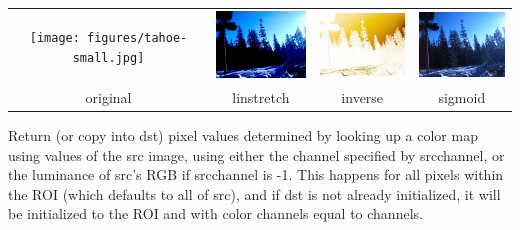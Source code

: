 \noindent \begin{tabular}{cccc}
\texttt{[image: figures/tahoe-small.jpg]} &
\includegraphics[width=1.1in]{figures/tahoe-lincontrast.jpg} &
\includegraphics[width=1.1in]{figures/tahoe-inverse.jpg} &
\includegraphics[width=1.1in]{figures/tahoe-sigmoid.jpg} \\
original & linstretch & inverse & sigmoid \\
\end{tabular}
\apiend


 

Return (or copy into {\cf dst}) pixel values determined by looking up a
color map using values of the {\cf src} image, using either the channel
specified by {\cf srcchannel}, or the luminance of {\cf src}'s RGB if {\cf
srcchannel} is -1. This happens for all pixels within the ROI (which
defaults to all of {\cf src}), and if {\cf dst} is not already initialized,
it will be initialized to the ROI and with color channels equal to {\cf channels}.


